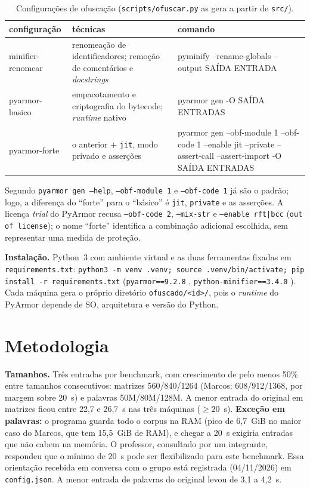 \documentclass[12pt]{article}
\begin{document}
\begin{table}[!htbp]\centering\footnotesize
\caption{Configurações de ofuscação (\texttt{scripts/ofuscar.py} as gera a partir de \texttt{src/}).}\label{tab:cfg}
\begin{tabular}{p{3.1cm}p{3.6cm}>{\raggedright\ttfamily\scriptsize\arraybackslash}p{7.2cm}}\hline
configuração & técnicas & comando \\ \hline
minifier-renomear & renomeação de identificadores; remoção de comentários e \emph{docstrings} &
pyminify --rename-globals --output SAÍDA ENTRADA \\[3pt]
pyarmor-basico & empacotamento e criptografia do bytecode; \emph{runtime} nativo &
pyarmor gen -O SAÍDA ENTRADAS \\[3pt]
pyarmor-forte & o anterior $+$ \texttt{jit}, modo privado e asserções &
pyarmor gen --obf-module 1 --obf-code 1 --enable jit --private --assert-call --assert-import -O SAÍDA ENTRADAS \\ \hline
\end{tabular}
\end{table}
Segundo \texttt{pyarmor gen --help}, \texttt{--obf-module 1} e \texttt{--obf-code 1} já são o padrão; logo, a diferença
do ``forte'' para o ``básico'' é \texttt{jit}, \texttt{private} e as asserções.
A licença \emph{trial} do PyArmor recusa \texttt{--obf-code 2}, \texttt{--mix-str} e \texttt{--enable rft|bcc}
(\texttt{out of license}); o nome ``forte'' identifica a combinação adicional escolhida, sem representar uma medida de proteção.

\textbf{Instalação.} Python~3 com ambiente virtual e as duas ferramentas fixadas em \texttt{requirements.txt}:
\texttt{python3 -m venv .venv; source .venv/bin/activate; pip install -r requirements.txt}
(\texttt{pyarmor==9.2.8} \cite{pyarmor}, \texttt{python-minifier==3.4.0} \cite{pyminifier}). Cada máquina gera o próprio diretório
\texttt{ofuscado/<id>/}, pois o \emph{runtime} do PyArmor depende de SO, arquitetura e versão do Python.

\section{Metodologia}
\textbf{Tamanhos.} Três entradas por benchmark, com crescimento de pelo menos 50\% entre tamanhos consecutivos: matrizes
560/840/1264 (Marcos: 608/912/1368, por margem sobre 20~s) e palavras 50M/80M/128M. A menor entrada do
original em matrizes ficou entre 22,7 e 26,7~s nas três máquinas ($\ge 20$~s).
\textbf{Exceção em palavras:} o programa guarda todo o corpus na RAM (pico de 6,7~GiB no maior caso do Marcos, que tem 15,5~GiB de RAM), e chegar a
20~s exigiria entradas que não cabem na memória. O professor, consultado por um integrante, respondeu que o
mínimo de 20~s pode ser flexibilizado para este benchmark. Essa orientação recebida em conversa com o grupo está registrada (04/11/2026) em
\texttt{config.json}. A menor entrada de palavras do original levou de 3,1 a 4,2~s.
\end{document}
